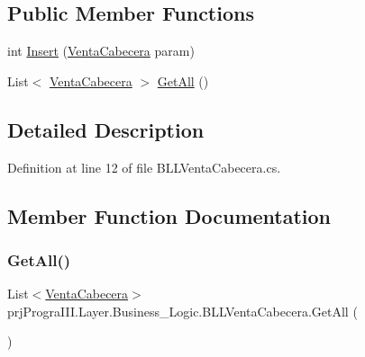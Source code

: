 \subsection*{Public Member Functions}
\begin{DoxyCompactItemize}
\item 
int \hyperlink{classprj_progra_i_i_i_1_1_layer_1_1_business___logic_1_1_b_l_l_venta_cabecera_a4e982cb2c77f88dd3d2ae1f8228ac3ae}{Insert} (\hyperlink{classprj_progra_i_i_i_1_1_layer_1_1_entities_1_1_venta_cabecera}{Venta\+Cabecera} param)
\item 
List$<$ \hyperlink{classprj_progra_i_i_i_1_1_layer_1_1_entities_1_1_venta_cabecera}{Venta\+Cabecera} $>$ \hyperlink{classprj_progra_i_i_i_1_1_layer_1_1_business___logic_1_1_b_l_l_venta_cabecera_a11eecee0fcc7e296eb741393161a1739}{Get\+All} ()
\end{DoxyCompactItemize}


\subsection{Detailed Description}


Definition at line 12 of file B\+L\+L\+Venta\+Cabecera.\+cs.



\subsection{Member Function Documentation}
\hypertarget{classprj_progra_i_i_i_1_1_layer_1_1_business___logic_1_1_b_l_l_venta_cabecera_a11eecee0fcc7e296eb741393161a1739}{}\label{classprj_progra_i_i_i_1_1_layer_1_1_business___logic_1_1_b_l_l_venta_cabecera_a11eecee0fcc7e296eb741393161a1739} 
\subsubsection{\texorpdfstring{Get\+All()}{GetAll()}}
{\footnotesize\ttfamily List$<$\hyperlink{classprj_progra_i_i_i_1_1_layer_1_1_entities_1_1_venta_cabecera}{Venta\+Cabecera}$>$ prj\+Progra\+I\+I\+I.\+Layer.\+Business\+\_\+\+Logic.\+B\+L\+L\+Venta\+Cabecera.\+Get\+All (\begin{DoxyParamCaption}{ }\end{DoxyParamCaption})}



